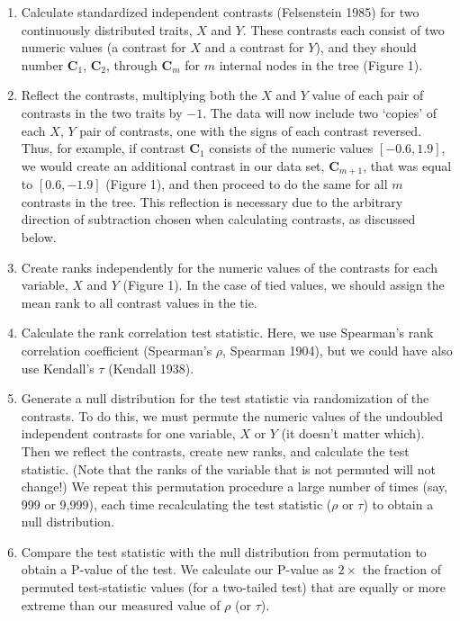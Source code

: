 \documentclass[fleqn,10pt,lineno]{wlpeerj} %
\begin{document}
\begin{enumerate}
\def\labelenumi{\arabic{enumi}.}
\item
  Calculate standardized independent contrasts (Felsenstein 1985) for two continuously distributed traits, \(X\) and \(Y\). These contrasts each consist of two numeric values (a contrast for \(X\) and a contrast for \(Y\)), and they should number \(\textbf{C}_1\), \(\textbf{C}_2\), through \(\textbf{C}_m\) for \(m\) internal nodes in the tree (Figure 1).
\item
  Reflect the contrasts, multiplying both the \(X\) and \(Y\) value of each pair of contrasts in the two traits by \(-1\). The data will now include two `copies' of each \(X\), \(Y\) pair of contrasts, one with the signs of each contrast reversed. Thus, for example, if contrast \(\textbf{C}_1\) consists of the numeric values \([-0.6,1.9]\), we would create an additional contrast in our data set, \(\textbf{C}_{m+1}\), that was equal to \([0.6,-1.9]\) (Figure 1), and then proceed to do the same for all \(m\) contrasts in the tree. This reflection is necessary due to the arbitrary direction of subtraction chosen when calculating contrasts, as discussed below.
\item
  Create ranks independently for the numeric values of the contrasts for each variable, \(X\) and \(Y\) (Figure 1). In the case of tied values, we should assign the mean rank to all contrast values in the tie.
\item
  Calculate the rank correlation test statistic. Here, we use Spearman's rank correlation coefficient (Spearman's \(\rho\), Spearman 1904), but we could have also use Kendall's \(\tau\) (Kendall 1938).
\item
  Generate a null distribution for the test statistic via randomization of the contrasts. To do this, we must permute the numeric values of the undoubled independent contrasts for one variable, \(X\) or \(Y\) (it doesn't matter which). Then we reflect the contrasts, create new ranks, and calculate the test statistic. (Note that the ranks of the variable that is not permuted will not change!) We repeat this permutation procedure a large number of times (say, 999 or 9,999), each time recalculating the test statistic (\(\rho\) or \(\tau\)) to obtain a null distribution.
\item
  Compare the test statistic with the null distribution from permutation to obtain a P-value of the test. We calculate our P-value as \(2 \times\) the fraction of permuted test-statistic values (for a two-tailed test) that are equally or more extreme than our measured value of \(\rho\) (or \(\tau\)).
\end{enumerate}
\end{document}
